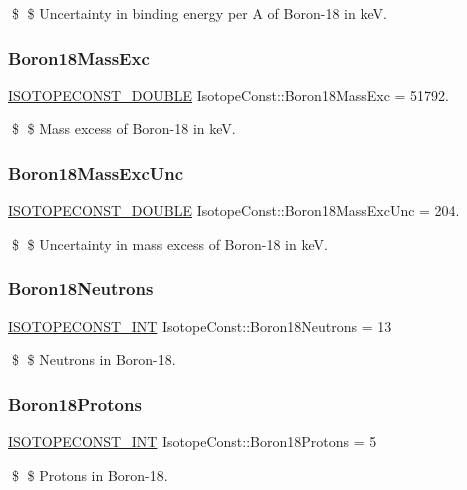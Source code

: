 \$ \$ Uncertainty in binding energy per A of Boron-\/18 in keV. \mbox{\label{group___isotope_const-_boron-_b18_ga98d9da5ea146226c99fa983ffd34ab7c}} 
\subsubsection{\texorpdfstring{Boron18\+Mass\+Exc}{Boron18MassExc}}
{\footnotesize\ttfamily \mbox{\hyperlink{group___isotope_const-_macros_ga8f45a7272ce02c0b4c65c44636ed719a}{I\+S\+O\+T\+O\+P\+E\+C\+O\+N\+S\+T\+\_\+\+D\+O\+U\+B\+LE}} Isotope\+Const\+::\+Boron18\+Mass\+Exc = 51792.}

\$ \$ Mass excess of Boron-\/18 in keV. \mbox{\label{group___isotope_const-_boron-_b18_gaaf85dffc730ffa4c50039ef8de06b17e}} 
\subsubsection{\texorpdfstring{Boron18\+Mass\+Exc\+Unc}{Boron18MassExcUnc}}
{\footnotesize\ttfamily \mbox{\hyperlink{group___isotope_const-_macros_ga8f45a7272ce02c0b4c65c44636ed719a}{I\+S\+O\+T\+O\+P\+E\+C\+O\+N\+S\+T\+\_\+\+D\+O\+U\+B\+LE}} Isotope\+Const\+::\+Boron18\+Mass\+Exc\+Unc = 204.}

\$ \$ Uncertainty in mass excess of Boron-\/18 in keV. \mbox{\label{group___isotope_const-_boron-_b18_ga97b44bb88338353e28adb82dce76cd4f}} 
\subsubsection{\texorpdfstring{Boron18\+Neutrons}{Boron18Neutrons}}
{\footnotesize\ttfamily \mbox{\hyperlink{group___isotope_const-_macros_ga5f18360b3e99483a35c32d789e62621c}{I\+S\+O\+T\+O\+P\+E\+C\+O\+N\+S\+T\+\_\+\+I\+NT}} Isotope\+Const\+::\+Boron18\+Neutrons = 13}

\$ \$ Neutrons in Boron-\/18. \mbox{\label{group___isotope_const-_boron-_b18_gad89ea647843f810ff844dd07f010744e}} 
\subsubsection{\texorpdfstring{Boron18\+Protons}{Boron18Protons}}
{\footnotesize\ttfamily \mbox{\hyperlink{group___isotope_const-_macros_ga5f18360b3e99483a35c32d789e62621c}{I\+S\+O\+T\+O\+P\+E\+C\+O\+N\+S\+T\+\_\+\+I\+NT}} Isotope\+Const\+::\+Boron18\+Protons = 5}

\$ \$ Protons in Boron-\/18. 